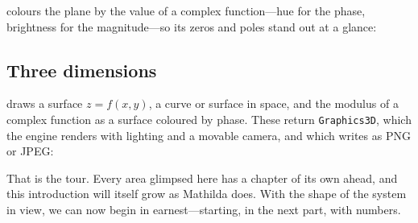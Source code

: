  colours the plane by the value of a complex function---hue for the phase,
brightness for the magnitude---so its zeros and poles stand out at a glance:


\subsection{Three dimensions}

 draws a surface $z=f(x,y)$,  a curve or surface in space,
and  the modulus of a complex function as a surface coloured by phase.
These return \texttt{Graphics3D}, which the engine renders with lighting and a movable camera,
and which  writes as PNG or JPEG:




\bigskip
\noindent
That is the tour. Every area glimpsed here has a chapter of its own ahead, and this
introduction will itself grow as Mathilda does. With the shape of the system in view,
we can now begin in earnest---starting, in the next part, with numbers.

